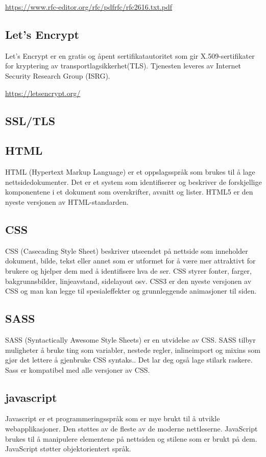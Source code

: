 \url{https://www.rfc-editor.org/rfc/pdfrfc/rfc2616.txt.pdf}

\subsection{Let’s Encrypt}
Let’s Encrypt er en gratis og åpent sertifikatautoritet som gir X.509-sertifikater for kryptering av transportlagsikkerhet(TLS). Tjenesten leveres av Internet Security Research Group (ISRG).

\url{https://letsencrypt.org/}

\subsection{SSL/TLS}
\subsection{HTML}
HTML (Hypertext Markup Language) er et oppslagsspråk som brukes til å lage nettsidedokumenter. Det er et system som identifiserer og beskriver de forskjellige komponentene i et dokument som overskrifter, avsnitt og lister. HTML5 er den nyeste versjonen av HTML-standarden.

\subsection{CSS}
CSS (Casecading Style Sheet) beskriver utseendet på nettside som inneholder dokument, bilde, tekst eller annet som er utformet for å være mer attraktivt for brukere og hjelper dem med å identifisere hva de ser. CSS styrer fonter, farger, bakgrunnsbilder, linjeavstand, sidelayout osv. CSS3 er den nyeste versjonen av CSS og man kan legge til spesialeffekter og grunnleggende animasjoner til siden.

\subsection{SASS}
SASS (Syntactically Awesome Style Sheets) er en utvidelse av CSS. SASS tilbyr muligheter å bruke ting som variabler, nestede regler, inlineimport og mixins som gjør det lettere å gjenbruke CSS syntaks.. Det lar deg også lage stilark raskere. Sass er kompatibel med alle versjoner av CSS.  

\subsection{javascript}
Javascript er et programmeringsspråk som er mye brukt til å utvikle webapplikasjoner. Den støttes av de fleste av de moderne nettleserne. JavaScript brukes til å manipulere elementene på nettsiden og stilene som er brukt på dem. JavaScript støtter objektorientert språk.

